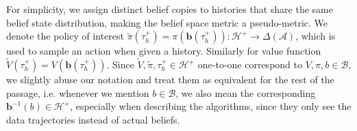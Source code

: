\documentclass[twoside]{article}
\newcommand{\CAL}[1]{\mathcal{#1}}
\newcommand{\zyh}[1]{{\color{blue}{ [\textbf{Youheng:}} #1]}}
\begin{document}
 For simplicity, we assign distinct belief copies to histories that share the same belief state distribution, making the belief space metric a pseudo-metric. We denote the policy of interest $\tilde{\pi}(\tau_h^+)=\pi(\mathbf{b}(\tau_h^+)):\mathcal{H}^+\to\Delta(\mathcal{A})$, which is used to sample an action when given a history. Similarly for value function $\tilde{V}(\tau_h^+)=V(\mathbf{b}(\tau_h^+))$. Since $\tilde{V},\tilde{\pi},\tau_h^+\in\CAL{H}^+$ one-to-one correspond to $V,\pi,b\in\CAL{B}$, we slightly abuse our notation and treat them as equivalent for the rest of the passage, i.e. whenever we mention $b\in\CAL{B}$, we also mean the corresponding $\mathbf{b}^{-1}(b)\in\CAL{H}^+$, especially when describing the algorithms, since they only see the data trajectories instead of actual beliefs.%


\end{document}
